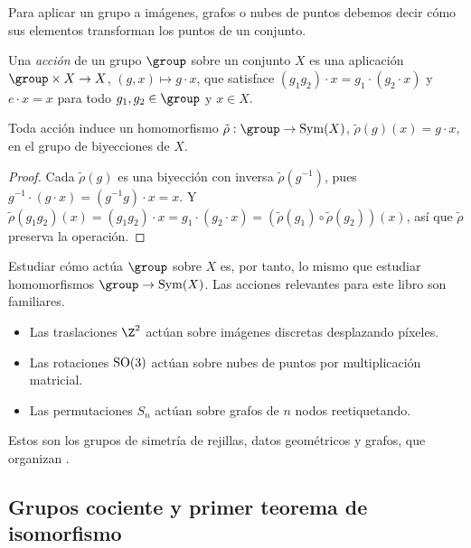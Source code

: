 Para aplicar un grupo a im\'agenes, grafos o nubes de puntos debemos decir c\'omo
sus elementos transforman los puntos de un conjunto.

\begin{definition}
\label{def:found:action}
Una \emph{acci\'on} de un grupo $\group$ sobre un conjunto $X$ es una aplicaci\'on
$\group \times X \to X$, $(g, x) \mapsto g \cdot x$, que satisface
$(g_1 g_2) \cdot x = g_1 \cdot (g_2 \cdot x)$ y $e \cdot x = x$ para todo
$g_1, g_2 \in \group$ y $x \in X$.
\end{definition}

\begin{proposition}
\label{prop:found:action-hom}
Toda acci\'on induce un homomorfismo $\tilde\rho : \group \to \Sym(X)$,
$\tilde\rho(g)(x) = g \cdot x$, en el grupo de biyecciones de $X$.
\end{proposition}

\begin{proof}
Cada $\tilde\rho(g)$ es una biyecci\'on con inversa $\tilde\rho(g^{-1})$, pues
$g^{-1}\cdot(g\cdot x) = (g^{-1}g)\cdot x = x$. Y $\tilde\rho(g_1 g_2)(x) =
(g_1 g_2)\cdot x = g_1\cdot(g_2\cdot x) = (\tilde\rho(g_1)\circ\tilde\rho(g_2))(x)$,
as\'i que $\tilde\rho$ preserva la operaci\'on.
\end{proof}

Estudiar c\'omo act\'ua $\group$ sobre $X$ es, por tanto, lo mismo que estudiar
homomorfismos $\group \to \Sym(X)$. Las acciones relevantes para este libro son
familiares.

\begin{example}
\label{ex:found:actions}
\leavevmode
\begin{itemize}
  \item Las traslaciones $\Z^2$ act\'uan sobre im\'agenes discretas desplazando
    p\'ixeles.
  \item Las rotaciones $\operatorname{SO}(3)$ act\'uan sobre nubes de puntos por multiplicaci\'on
    matricial.
  \item Las permutaciones $S_n$ act\'uan sobre grafos de $n$ nodos reetiquetando.
\end{itemize}
Estos son los grupos de simetr\'ia de rejillas, datos geom\'etricos y grafos, que
organizan .
\end{example}

\subsection{Grupos cociente y primer teorema de isomorfismo}
\label{sec:found:quotients}

